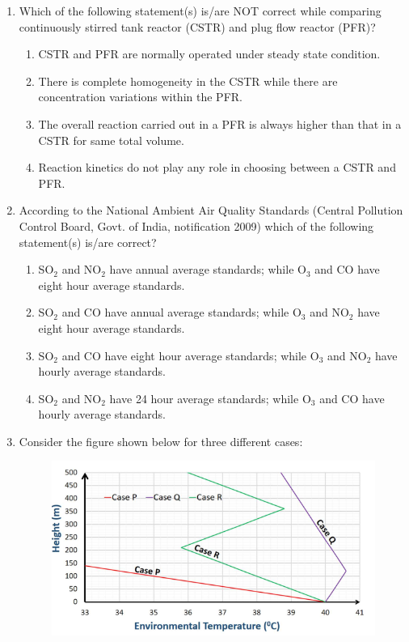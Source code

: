 \documentclass[12pt,a4paper]{article}
\begin{document}
\begin{enumerate}
   \item Which of the following statement(s) is/are NOT correct while comparing continuously stirred tank reactor (CSTR) and plug flow reactor (PFR)?
         \begin{enumerate}
            \item CSTR and PFR are normally operated under steady state condition.
            \item There is complete homogeneity in the CSTR while there are concentration variations within the PFR.
            \item The overall reaction carried out in a PFR is always higher than that in a CSTR for same total volume.
            \item Reaction kinetics do not play any role in choosing between a CSTR and PFR.
         \end{enumerate}

   \item According to the National Ambient Air Quality Standards (Central Pollution Control Board, Govt. of India, notification 2009) which of the following statement(s) is/are correct?
         \begin{enumerate}
            \item SO$_2$ and NO$_2$ have annual average standards; while O$_3$ and CO have eight hour average standards.
            \item SO$_2$ and CO have annual average standards; while O$_3$ and NO$_2$ have eight hour average standards.
            \item SO$_2$ and CO have eight hour average standards; while O$_3$ and NO$_2$ have hourly average standards.
            \item SO$_2$ and NO$_2$ have 24 hour average standards; while O$_3$ and CO have hourly average standards.
         \end{enumerate}

   \item Consider the figure shown below for three different cases:

         \begin{figure}[H]
            \centering
            \includegraphics[scale=0.6]{q48}
            \label{fig:q48}
         \end{figure}


\end{enumerate}
\end{document}
